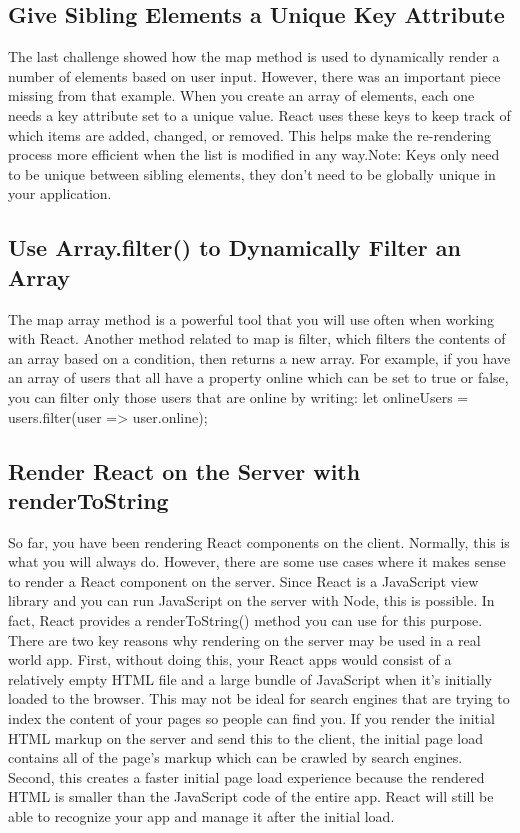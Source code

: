 \documentclass{article}%
\begin{document}
%
\subsection{Give Sibling Elements a Unique Key Attribute}%
\label{subsec:GiveSiblingElementsaUniqueKeyAttribute}%
The last challenge showed how the map method is used to dynamically render a number of elements based on user input. However, there was an important piece missing from that example. When you create an array of elements, each one needs a key attribute set to a unique value. React uses these keys to keep track of which items are added, changed, or removed. This helps make the re{-}rendering process more efficient when the list is modified in any way.Note: Keys only need to be unique between sibling elements, they don't need to be globally unique in your application.\newline%

%
\subsection{Use Array.filter() to Dynamically Filter an Array}%
\label{subsec:UseArray.filter()toDynamicallyFilteranArray}%
The map array method is a powerful tool that you will use often when working with React. Another method related to map is filter, which filters the contents of an array based on a condition, then returns a new array. For example, if you have an array of users that all have a property online which can be set to true or false, you can filter only those users that are online by writing:\newline%
let onlineUsers = users.filter(user => user.online);\newline%

%
\subsection{Render React on the Server with renderToString}%
\label{subsec:RenderReactontheServerwithrenderToString}%
So far, you have been rendering React components on the client. Normally, this is what you will always do. However, there are some use cases where it makes sense to render a React component on the server. Since React is a JavaScript view library and you can run JavaScript on the server with Node, this is possible. In fact, React provides a renderToString() method you can use for this purpose.\newline%
There are two key reasons why rendering on the server may be used in a real world app. First, without doing this, your React apps would consist of a relatively empty HTML file and a large bundle of JavaScript when it's initially loaded to the browser. This may not be ideal for search engines that are trying to index the content of your pages so people can find you. If you render the initial HTML markup on the server and send this to the client, the initial page load contains all of the page's markup which can be crawled by search engines. Second, this creates a faster initial page load experience because the rendered HTML is smaller than the JavaScript code of the entire app. React will still be able to recognize your app and manage it after the initial load.\newline%
\end{document}

